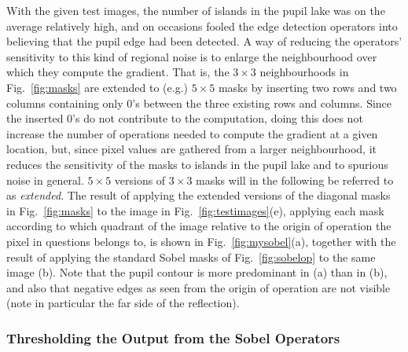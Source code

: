 With the given test images, the number of islands in the pupil lake
was on the average relatively high, and on occasions fooled the edge
detection operators into believing that the pupil edge had been
detected.  A way of reducing the operators' sensitivity to this kind
of regional noise is to enlarge the neighbourhood over which they
compute the gradient.  That is, the $3\times 3$ neighbourhoods in
Fig.~\ref{fig:masks} are extended to (e.g.) $5\times 5$ masks by
inserting two rows and two columns containing only 0's between the
three existing rows and columns.  Since the inserted 0's do not
contribute to the computation, doing this does not increase the number
of operations needed to compute the gradient at a given location, but,
since pixel values are gathered from a larger neighbourhood, it
reduces the sensitivity of the masks to islands in the pupil lake and
to spurious noise in general.  $5\times 5$ versions of $3\times 3$
masks will in the following be referred to as {\em extended\/}.  The
result of applying the extended versions of the diagonal masks in
Fig.~\ref{fig:masks} to the image in Fig.~\ref{fig:testimages}(e),
applying each mask according to which quadrant of the image relative
to the origin of operation the pixel in questions belongs to, is shown
in Fig.~\ref{fig:mysobel}(a), together with the result of applying the
standard Sobel masks of Fig.~\ref{fig:sobelop} to the same image (b).
Note that the pupil contour is more predominant in (a) than in (b),
and also that negative edges as seen from the origin of operation are
not visible (note in particular the far side of the reflection).

\subsubsection{Thresholding the Output from the Sobel Operators}


